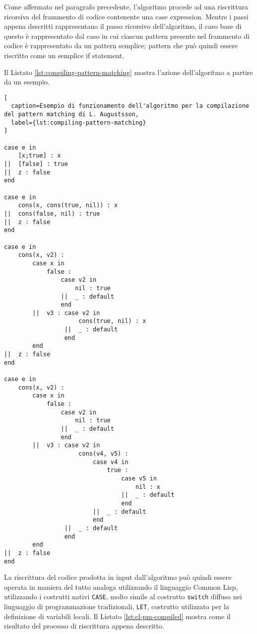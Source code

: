 Come affermato nel paragrafo precedente, l'algoritmo procede ad una riscrittura
ricorsiva del frammento di codice contenente una case expression. Mentre i passi
appena descritti rappresentano il passo ricorsivo dell'algoritmo, il caso base
di questo è rappresentato dal caso in cui ciascun pattern presente nel frammento
di codice è rappresentato da un pattern semplice; pattern che può quindi essere
riscritto come un semplice if statement.

Il Listato \ref{lst:compiling-pattern-matching} mostra l'azione dell'algoritmo a
partire da un esempio.

\begin{lstlisting}[
  caption=Esempio di funzionamento dell'algoritmo per la compilazione del pattern matching di L. Augustsson,
  label={lst:compiling-pattern-matching}
]

case e in
    [x;true] : x
||  [false] : true
||  z : false
end

case e in
    cons(x, cons(true, nil)) : x
||  cons(false, nil) : true
||  z : false
end

case e in
    cons(x, v2) :
        case x in
            false :
                case v2 in
                    nil : true
                ||  _ : default
                end
        ||  v3 : case v2 in
                     cons(true, nil) : x
                 ||  _ : default
                 end
        end
||  z : false
end

case e in
    cons(x, v2) :
        case x in
            false :
                case v2 in
                    nil : true
                ||  _ : default
                end
        ||  v3 : case v2 in
                     cons(v4, v5) :
                         case v4 in
                             true :
                                 case v5 in
                                     nil : x
                                 ||  _ : default
                                 end
                         ||  _ : default
                         end
                 ||  _ : default
                 end
        end
||  z : false
end
\end{lstlisting}

La riscrittura del codice prodotta in input dall'algoritmo può quindi essere
operata in maniera del tutto analoga utilizzando il linguaggio Common Lisp,
utilizzando i costrutti nativi \texttt{CASE}, molto simile al costrutto
\texttt{switch} diffuso nei linguaggio di programmazione tradizionali,
\texttt{LET}, costrutto utilizzato per la definizione di variabili locali. Il
Listato \ref{lst:cl-pm-compiled} mostra come il risultato del processo di
riscrittura appena descritto.

